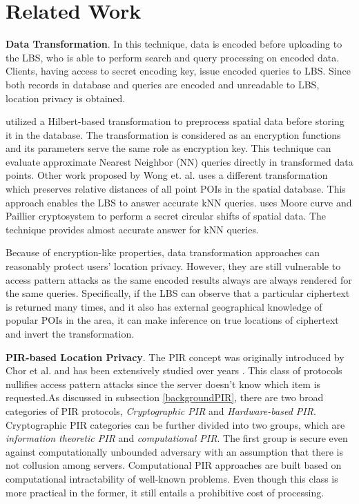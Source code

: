 
\section{Related Work}
\label{sec:related}


\textbf{Data Transformation}. In this technique, data is encoded before uploading to the LBS, who is able to perform search and query processing on encoded data. Clients, having access to secret encoding key, issue encoded queries to LBS. Since both records in database and queries are encoded and unreadable to LBS, location privacy is obtained.

\cite{Space_Transformation} utilized a Hilbert-based transformation to preprocess spatial data before storing it in the database. The transformation is considered as an encryption functions and its parameters serve the same role as encryption key. This technique can evaluate approximate Nearest Neighbor (NN) queries directly in transformed data points. Other work proposed by Wong et. al. \cite{secure_NN} uses a different transformation which preserves relative distances of all point POIs in the spatial database. This approach enables the LBS to answer accurate kNN queries. \cite{circular_shift_kNN} uses Moore curve and Paillier cryptosystem to perform a secret circular shifts of spatial data. The technique provides almost accurate answer for kNN queries. 

Because of encryption-like properties, data transformation approaches can reasonably protect users' location privacy. However, they are still vulnerable to access pattern attacks as the same encoded results always are always rendered for the same queries. Specifically, if the LBS can observe that a particular ciphertext is returned many times, and it also has external geographical knowledge of popular POIs in the area, it can make inference on true locations of ciphertext and invert the transformation.

\textbf{PIR-based Location Privacy}. The PIR concept was originally introduced by Chor et al. \cite{PIR_Origin} and has been extensively studied over years \cite{PIR2007, PIR2010, PIR2011, PIR_SC_2006}. This class of protocols nullifies access pattern attacks since the server doesn't know which item is requested.As discussed in subsection \ref{backgroundPIR}, there are two broad categories of PIR protocols, \textit{Cryptographic PIR} and \textit{Hardware-based PIR}. Cryptographic PIR categories can be further divided into two groups, which are \textit{information theoretic PIR} and \textit{computational PIR}. The first group is secure even against computationally unbounded adversary with an assumption that there is not collusion among servers. Computational PIR approaches are built based on computational intractability of well-known problems. Even though this class is more practical in the former, it still entails a prohibitive cost of processing. 

